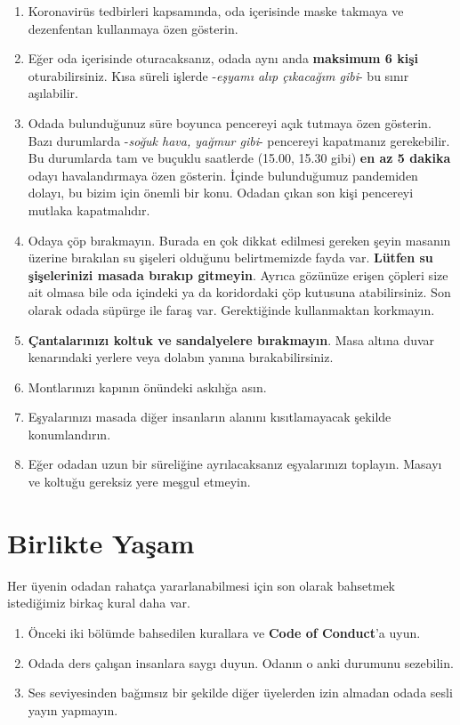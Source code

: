 \documentclass{article}
\begin{document}
\begin{enumerate}
    \item Koronavirüs tedbirleri kapsamında, oda içerisinde maske takmaya ve dezenfentan kullanmaya özen gösterin.
    \item Eğer oda içerisinde oturacaksanız, odada aynı anda \textbf{maksimum 6 kişi} oturabilirsiniz. Kısa süreli işlerde -\textit{eşyamı alıp çıkacağım gibi}-	bu sınır aşılabilir.
    \item Odada bulunduğunuz süre boyunca pencereyi açık tutmaya özen gösterin. Bazı durumlarda -\textit{soğuk hava, yağmur gibi}- pencereyi kapatmanız gerekebilir. Bu durumlarda tam ve buçuklu saatlerde (15.00, 15.30 gibi) \textbf{en az 5 dakika} odayı havalandırmaya özen gösterin. İçinde bulunduğumuz pandemiden dolayı, bu bizim için önemli bir konu. Odadan çıkan son kişi pencereyi mutlaka kapatmalıdır.
	\item Odaya çöp bırakmayın. Burada en çok dikkat edilmesi gereken şeyin	masanın üzerine bırakılan su şişeleri olduğunu belirtmemizde fayda var. \textbf{Lütfen su şişelerinizi masada bırakıp gitmeyin}. Ayrıca gözünüze erişen çöpleri size ait olmasa bile oda içindeki ya da koridordaki çöp kutusuna atabilirsiniz. Son olarak odada süpürge ile faraş var. Gerektiğinde kullanmaktan korkmayın.
	\item \textbf{Çantalarınızı koltuk ve sandalyelere bırakmayın}. Masa altına duvar kenarındaki yerlere veya dolabın yanına bırakabilirsiniz.
	\item Montlarınızı kapının önündeki askılığa asın.
	\item Eşyalarınızı masada diğer insanların alanını kısıtlamayacak şekilde konumlandırın.
	\item Eğer odadan uzun bir süreliğine ayrılacaksanız eşyalarınızı toplayın. Masayı ve koltuğu gereksiz yere meşgul etmeyin.
\end{enumerate}

\section{Birlikte Yaşam}
Her üyenin odadan rahatça yararlanabilmesi için son olarak bahsetmek istediğimiz birkaç kural daha var.
\begin{enumerate}
	\item Önceki iki bölümde bahsedilen kurallara ve \textbf{Code of Conduct}'a uyun.
	\item Odada ders çalışan insanlara saygı duyun. Odanın o anki durumunu sezebilin.
	\item Ses seviyesinden bağımsız bir şekilde diğer üyelerden izin almadan odada sesli yayın yapmayın.
\end{enumerate}
	
\end{document}
